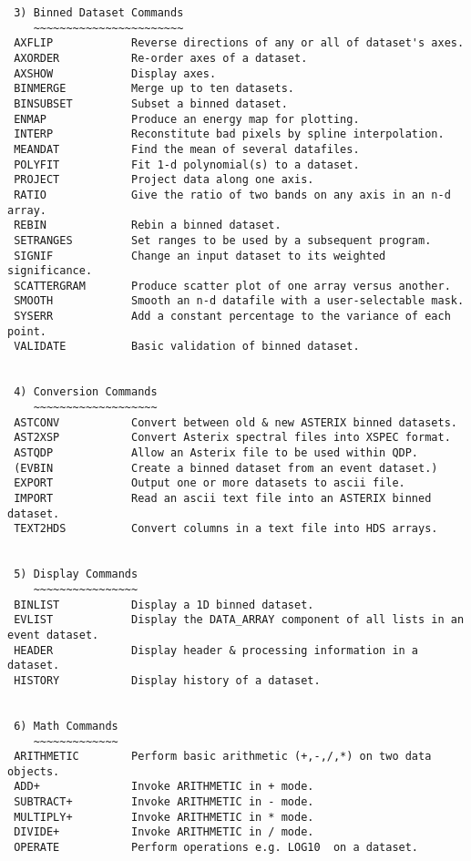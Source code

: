 \begin{verbatim}
 3) Binned Dataset Commands
    ~~~~~~~~~~~~~~~~~~~~~~~
 AXFLIP            Reverse directions of any or all of dataset's axes.
 AXORDER           Re-order axes of a dataset.
 AXSHOW            Display axes.
 BINMERGE          Merge up to ten datasets.
 BINSUBSET         Subset a binned dataset.
 ENMAP             Produce an energy map for plotting.
 INTERP            Reconstitute bad pixels by spline interpolation.
 MEANDAT           Find the mean of several datafiles.
 POLYFIT           Fit 1-d polynomial(s) to a dataset.
 PROJECT           Project data along one axis.
 RATIO             Give the ratio of two bands on any axis in an n-d array.
 REBIN             Rebin a binned dataset.
 SETRANGES         Set ranges to be used by a subsequent program.
 SIGNIF            Change an input dataset to its weighted significance.
 SCATTERGRAM       Produce scatter plot of one array versus another.
 SMOOTH            Smooth an n-d datafile with a user-selectable mask.
 SYSERR            Add a constant percentage to the variance of each point.
 VALIDATE          Basic validation of binned dataset.


 4) Conversion Commands
    ~~~~~~~~~~~~~~~~~~~
 ASTCONV           Convert between old & new ASTERIX binned datasets.
 AST2XSP           Convert Asterix spectral files into XSPEC format.
 ASTQDP            Allow an Asterix file to be used within QDP.
 (EVBIN            Create a binned dataset from an event dataset.)
 EXPORT            Output one or more datasets to ascii file.
 IMPORT            Read an ascii text file into an ASTERIX binned dataset.
 TEXT2HDS          Convert columns in a text file into HDS arrays.


 5) Display Commands
    ~~~~~~~~~~~~~~~~
 BINLIST           Display a 1D binned dataset.
 EVLIST            Display the DATA_ARRAY component of all lists in an event dataset.
 HEADER            Display header & processing information in a dataset.
 HISTORY           Display history of a dataset.


 6) Math Commands
    ~~~~~~~~~~~~~
 ARITHMETIC        Perform basic arithmetic (+,-,/,*) on two data objects.
 ADD+              Invoke ARITHMETIC in + mode.
 SUBTRACT+         Invoke ARITHMETIC in - mode.
 MULTIPLY+         Invoke ARITHMETIC in * mode.
 DIVIDE+           Invoke ARITHMETIC in / mode.
 OPERATE           Perform operations e.g. LOG10  on a dataset.



\end{verbatim}
